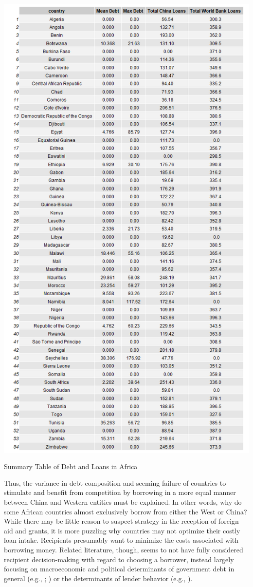 \documentclass[12pt]{article}
\begin{document}
\begin{table}
    \centering
    \includegraphics[scale=0.53]{Figures/summary1.png}
    \caption{Summary Table of Debt and Loans in Africa}
\end{table}

Thus, the variance in debt composition and seeming failure of countries to stimulate and benefit from competition by borrowing in a more equal manner between China and Western entities must be explained. In other words, why do some African countries almost exclusively borrow from either the West or China? While there may be little reason to suspect strategy in the reception of foreign aid and grants, it is more puzzling why countries may not optimize their costly loan intake. Recipients presumably want to minimize the costs associated with borrowing money. Related literature, though, seems to not have fully considered recipient decision-making with regard to choosing a borrower, instead largely focusing on macroeconomic and political determinants of government debt in general (e.g., \cite{bittencourt2015} ; \cite{swamy2015}) or the determinants of lender behavior (e.g., \cite{dreher2018}).
\end{document}
